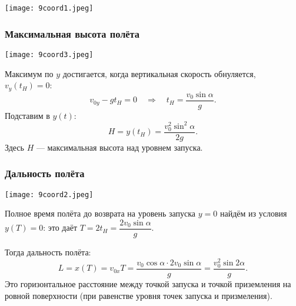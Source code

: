\documentclass[12pt, a4paper]{article}%
\begin{document}
\begin{center}
\texttt{[image: 9coord1.jpeg]}
\label{fig:mpr}
\end{center}

\subsubsection*{Максимальная высота полёта}

\begin{center}
\texttt{[image: 9coord3.jpeg]}
\label{fig:mpr}
\end{center}

Максимум по $y$ достигается, когда вертикальная скорость обнуляется, $v_y(t_H)=0$:
\[
v_{0y} - gt_H = 0 \quad\Rightarrow\quad t_H = \frac{v_0\sin\alpha}{g}.
\]
Подставим в $y(t)$:
\[
H = y(t_H) = \frac{v_0^2\sin^2\alpha}{2g}.
\]
Здесь $H$ — максимальная высота над уровнем запуска.

\subsubsection*{Дальность полёта}

\begin{center}
\texttt{[image: 9coord2.jpeg]}
\label{fig:mpr}
\end{center}

Полное время полёта до возврата на уровень запуска $y=0$ найдём из условия $y(T)=0$: это 
даёт $T = 2t_H = \dfrac{2v_0\sin\alpha}{g}$.

Тогда дальность полёта:
\[
L = x(T) = v_{0x}T = \frac{v_0\cos\alpha\cdot 2v_0\sin\alpha}{g} = \frac{v_0^2\sin2\alpha}{g}.
\]
Это горизонтальное расстояние между точкой запуска и точкой приземления на ровной поверхности (при равенстве уровня точек запуска и призмеления).
\end{document}
